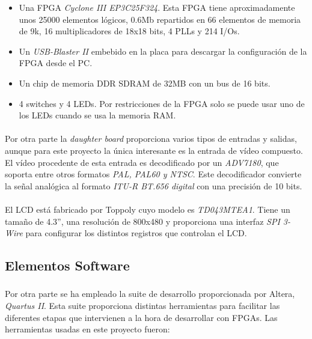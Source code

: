 \documentclass[a4paper,12pt,titlepage,final]{book}
\begin{document}
\begin{itemize}
\item Una FPGA \textit{Cyclone III EP3C25F324}. Esta FPGA tiene aproximadamente unos 25000 elementos lógicos, 0.6Mb repartidos en 66 elementos de memoria de 9k, 16 multiplicadores de 18x18 bits, 4 PLLs y 214 I/Os.

\item Un \textit{USB-Blaster II} embebido en la placa para descargar la configuración de la FPGA desde el PC.

\item Un chip de memoria DDR SDRAM de 32MB con un bus de 16 bits.

\item 4 switches y 4 LEDs. Por restricciones de la FPGA solo se puede usar uno de los LEDs cuando se usa la memoria RAM.
\end{itemize}

\paragraph{}
Por otra parte la \textit{daughter board} proporciona varios tipos de entradas y salidas, aunque para este proyecto la única interesante es la entrada de vídeo compuesto. El vídeo procedente de esta entrada es decodificado por un \textit{ADV7180}, que soporta entre otros formatos \textit{PAL, PAL60 y NTSC}. Este decodificador convierte  la señal analógica al formato \textit{ITU-R BT.656 digital} con una precisión de 10 bits.

\paragraph{}
El LCD está fabricado por Toppoly cuyo modelo es \textit{TD043MTEA1}. Tiene un tamaño de 4.3”, una resolución de 800x480 y proporciona una interfaz \textit{SPI 3-Wire} para configurar los distintos registros que controlan el LCD.

\subsection{Elementos Software}
\subsubsection*{}

\paragraph{}
Por otra parte se ha empleado la suite de desarrollo proporcionada por Altera, \textit{Quartus II}. Esta suite proporciona distintas herramientas para facilitar las diferentes etapas que intervienen a la hora de desarrollar con FPGAs. Las herramientas usadas en este proyecto fueron:
\end{document}
